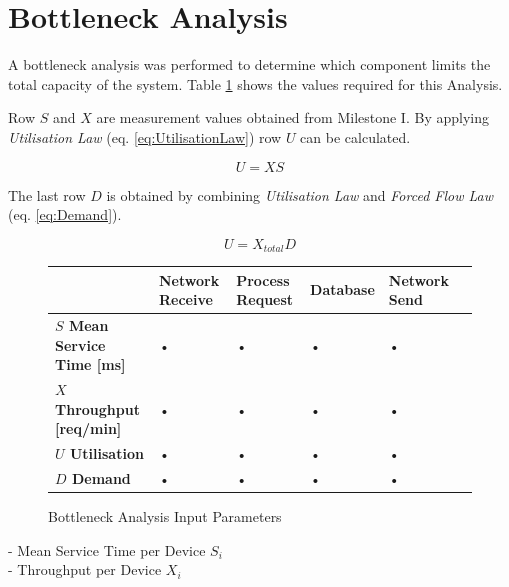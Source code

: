 \documentclass[a4paper]{article}
\begin{document}
\section{Bottleneck Analysis}

A bottleneck analysis was performed to determine which component limits the total capacity of the system. Table \ref{tabular:BottleneckParams} shows the values required for this Analysis.

Row $S$ and $X$ are measurement values obtained from Milestone I. By applying \textit{Utilisation Law} (eq. \ref{eq:UtilisationLaw}) row $U$ can be calculated.   

\begin{equation}
\label{eq:UtilisationLaw}
U = X S
\end{equation}


The last row $D$ is obtained by combining \textit{Utilisation Law} and \textit{Forced Flow Law} (eq. \ref{eq:Demand}). 

\begin{equation}
\label{eq:Demand}
U = X_{total} D
\end{equation}


\begin{figure}[H]
\label{tabular:BottleneckParams}
\begin{center}
\begin{tabular}{|l|l|l|l|l|l|}
\hline 
 & \textbf{Network Receive} & \textbf{Process Request} & \textbf{Database} & \textbf{Network Send}\\ 
\hline
\textbf{$S$ Mean Service Time [ms]} & • & • & • & • \\
\hline 
\textbf{$X$ Throughput [req/min]} & • & • & • & • \\
\hline
\textbf{$U$ Utilisation} & • & • & • & • \\
\hline
\textbf{$D$ Demand} & • & • & • & • \\
\hline
\end{tabular} 
\caption{Bottleneck Analysis Input Parameters}
\end{center}
\end{figure}


- Mean Service Time per Device $S_i$\\
- Throughput per Device $X_i$


\end{document}
